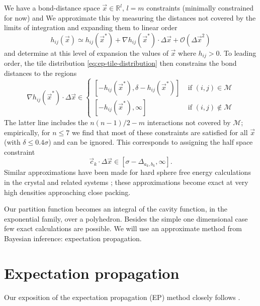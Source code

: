 \documentclass[11pt,twoside]{report}
\begin{document}
We have a bond-distance space $\vec{x} \in \mathbb{R}^l$, $l = m$ constraints (minimally constrained for now) and 
We approximate this by measuring the distances not covered by the limits of integration and expanding them to linear order
\begin{equation}
  h_{ij}(\vec{x})
  \simeq
  h_{ij}(\vec{x}^*)
  + \nabla h_{ij}(\vec{x}^*) \cdot \Delta \vec{x}
  + \mathcal{O}(\Delta \vec{x}^2)
\end{equation}
and determine at this level of expansion the values of $\vec{x}$ where $h_{ij} > 0$.
To leading order, the tile distribution \eqref{eq:ep-tile-distribution} then constrains the bond distances to the regions
\begin{equation*}
  \nabla h_{ij}(\vec{x}^*) \cdot \Delta \vec{x}
  \in
  \begin{cases}
    [-h_{ij}(\vec{x}^*), \delta - h_{ij}(\vec{x}^*)] & \textrm{ if } (i,j) \in \mathcal{M} \\
    [-h_{ij}(\vec{x}^*), \infty] & \textrm{ if } (i,j) \notin \mathcal{M}
  \end{cases}
\end{equation*}
The latter line includes the $n(n-1)/2 - m$ interactions not covered by $\mathcal{M}$; empirically, for $n \le 7$ we find that most of these constraints are satisfied for all $\vec{x}$ (with $\delta \le 0.4\sigma$) and can be ignored.
This corresponds to assigning the half space constraint
\begin{equation}
  \vec{c}_k \cdot \Delta \vec{x} \in [\sigma - \Delta_{a_k,b_k}, \infty].
\end{equation}
Similar approximations have been made for hard sphere free energy calculations in the crystal \cite{RadinPRL2005,KochPRE2005} and related systems \cite{LeoniPRL2017}; these approximations become exact at very high densities approaching close packing.

Our partition function becomes an integral of the cavity function, in the exponential family, over a polyhedron.
Besides the simple one dimensional case few exact calculations are possible.
We will use an approximate method from Bayesian inference: expectation propagation.

\section{Expectation propagation}
\label{sec:ep-integration}

Our exposition of the expectation propagation (EP) method closely follows \cite{Cunningham2011}.
\end{document}
